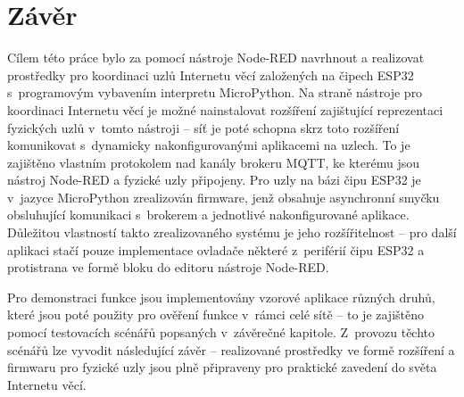 \chapter{Závěr}
\label{ch:zaver}

Cílem této práce bylo za pomocí nástroje Node-RED navrhnout a realizovat prostředky pro koordinaci uzlů Internetu věcí
založených na čipech ESP32 s~programovým vybavením interpretu MicroPython.
Na straně nástroje pro koordinaci Internetu věcí je možné nainstalovat rozšíření zajištující reprezentaci fyzických
uzlů v~tomto nástroji
-- síť je poté schopna skrz toto rozšíření komunikovat s~dynamicky nakonfigurovanými aplikacemi na uzlech.
To je zajištěno vlastním protokolem nad kanály brokeru MQTT, ke kterému jsou nástroj Node-RED a fyzické uzly připojeny.
Pro uzly na bázi čipu ESP32 je v~jazyce MicroPython zrealizován firmware, jenž obsahuje asynchronní smyčku
obsluhující komunikaci s~brokerem a jednotlivé nakonfigurované aplikace.
Důležitou vlastností takto zrealizovaného systému je jeho rozšířitelnost -- pro další aplikaci stačí pouze implementace
ovladače některé z~periférií čipu ESP32 a protistrana ve formě bloku do editoru nástroje Node-RED.

Pro demonstraci funkce jsou implementovány vzorové aplikace různých druhů, které jsou poté použity pro ověření
funkce v~rámci celé sítě -- to je zajištěno pomocí testovacích scénářů popsaných v~závěrečné kapitole.
Z~provozu těchto scénářů lze vyvodit následující závěr -- realizované prostředky ve formě rozšíření a firmwaru pro
fyzické uzly jsou plně připraveny pro praktické zavedení do světa Internetu věcí.